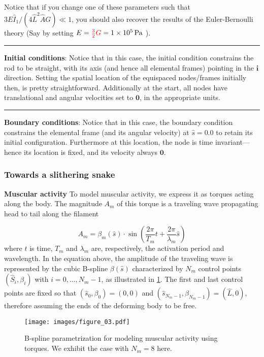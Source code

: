 \documentclass[11pt]{article}
\begin{document}
Notice that if you change one of these parameters such that \(3E\hat{I}_1/(4\hat{L}^2\hat{A}G)\ll 1\), you should also recover the
results of the Euler-Bernoulli theory (Say by setting \(E = \textcolor{red}{\frac{3}{2}G} = \SI{1e5}{\Pa}\) ).

\noindent\rule{1\textwidth}{0.01pt}
\textbf{Initial conditions}: Notice that in this case, the initial
condition constrains the rod to be straight, with its axis (and hence all
elemental frames) pointing in the \(\mathbf{i}\) direction. Setting the spatial location
of the equispaced nodes/frames initially then, is pretty straightforward. Additionally at the
start, all nodes have translational and angular velocities set to \(\mathbf{0}\), in the
appropriate units.

\noindent\rule{1\textwidth}{0.01pt}
\textbf{Boundary conditions}: Notice that in this case, the boundary
condition constrains the elemental frame (and its angular velocity) at \(\hat{s} = 0.0\) to retain its initial configuration. Furthermore at this
location, the node is time invariant---hence its location is fixed, and its
velocity always \(\mathbf{0}\).
\subsubsection{Towards a slithering snake}
\label{sec:orgedb9da9}
\textbf{Muscular activity} To model muscular activity, we express it as torques
 acting along the body. The magnitude \(A_m\) of this torque is a traveling
 wave propagating head to tail along the filament

\[ A_m=\beta_m(\hat{s})\cdot\sin\left(\frac{2\pi}{T_m} t +
											\frac{2\pi}{\lambda_m}
											\hat{s}\right) \]
where \(t\) is time, \(T_m\) and \(\lambda_m\) are,
respectively, the activation period and wavelength. In the equation above,
the amplitude of the traveling wave is represented by the cubic B-spline \(\beta(\hat{s})\) characterized by \(N_m\) control points \((\hat{S}_i,\beta_i)\) with \(i=0,\dots,N_m-1\), as illustrated in
\cref{fig_spline}. The first and last control points are fixed so that \((\hat{s}_0,\beta_0)=(0,0)\)
and \((\hat{s}_{N_m-1},\beta_{N_m-1})=(\hat{L},0)\), therefore assuming the
ends of the deforming body to be free.

\begin{figure}[htbp]
\centering
\texttt{[image: images/figure\_03.pdf]}
\caption{\label{fig_spline}
B-spline parametrization for modeling muscular activity using torques. We exhibit the case with \(N_m = 8\) here.}
\end{figure}
\end{document}
